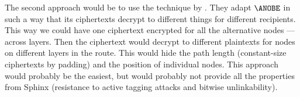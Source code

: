 The second approach would be to use the technique by \textcite{PPACinPubFS}.
They adapt \(\ANOBE\) in such a way that its ciphertexts decrypt to different 
things for different recipients.
This way we could have one ciphertext encrypted for all the alternative nodes 
--- across layers.
Then the ciphertext would decrypt to different plaintexts for nodes on different 
layers in the route.
This would hide the path length (constant-size ciphertexts by padding) and the 
position of individual nodes.
This approach would probably be the easiest, but would probably not provide all 
the properties from Sphinx (\eg resistance to active tagging attacks and bitwise 
unlinkability).


